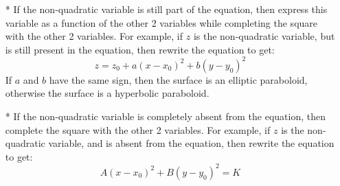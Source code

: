 \documentclass{article}
\begin{document}
\begin{itemize}
	\begin{itemize}
		\item[*] If the non-quadratic variable is still part of the equation, then express this variable as a function of the other 2 variables while completing the square with the other 2 variables. For example, if \(z\) is the non-quadratic variable, but is still present in the equation, then rewrite the equation to get:
		\[z = z_0 + a(x - x_0)^2 + b(y - y_0)^2\]
		If \(a\) and \(b\) have the same sign, then the surface is an elliptic paraboloid, otherwise the surface is a hyperbolic paraboloid.
		\item[*] If the non-quadratic variable is completely absent from the equation, then complete the square with the other 2 variables. For example, if \(z\) is the non-quadratic variable, and is absent from the equation, then rewrite the equation to get:
		\[A(x - x_0)^2 + B(y - y_0)^2 = K\]
	\end{itemize}
\end{itemize}
\end{document}
